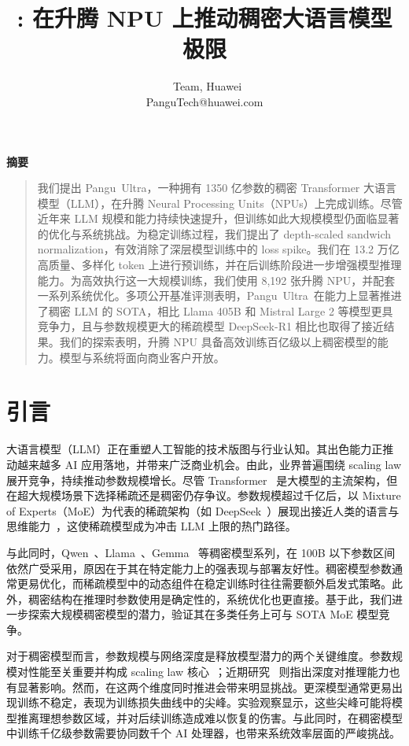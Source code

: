 \documentclass{article}
\title{\modelname: 在升腾 NPU 上推动稠密大语言模型极限}
\author{\pangu~Team, Huawei\\
PanguTech@huawei.com}
\newcommand{\pangu}{Pangu}
\newcommand{\modelname}{\pangu~Ultra}
\renewenvironment{abstract}
{
  \centerline{\large \bfseries 摘要}
  \vspace{0.5ex}
  \begin{quote}
}
{
  \end{quote}
}
\begin{document}
\maketitle

\thispagestyle{fancy}


\begin{abstract}

我们提出 \modelname，一种拥有 1350 亿参数的稠密 Transformer 大语言模型（LLM），在升腾 Neural Processing Units（NPUs）上完成训练。尽管近年来 LLM 规模和能力持续快速提升，但训练如此大规模模型仍面临显著的优化与系统挑战。为稳定训练过程，我们提出了 depth-scaled sandwich normalization，有效消除了深层模型训练中的 loss spike。我们在 13.2 万亿高质量、多样化 token 上进行预训练，并在后训练阶段进一步增强模型推理能力。为高效执行这一大规模训练，我们使用 8,192 张升腾 NPU，并配套一系列系统优化。多项公开基准评测表明，\modelname~在能力上显著推进了稠密 LLM 的 SOTA，相比 Llama 405B 和 Mistral Large 2 等模型更具竞争力，且与参数规模更大的稀疏模型 DeepSeek-R1 相比也取得了接近结果。我们的探索表明，升腾 NPU 具备高效训练百亿级以上稠密模型的能力。模型与系统将面向商业客户开放。
\end{abstract}



\section{引言}

大语言模型（LLM）正在重塑人工智能的技术版图与行业认知。其出色能力正推动越来越多 AI 应用落地，并带来广泛商业机会。由此，业界普遍围绕 scaling law 展开竞争，持续推动参数规模增长。尽管 Transformer~\cite{vaswani2017attention} 是大模型的主流架构，但在超大规模场景下选择稀疏还是稠密仍存争议。参数规模超过千亿后，以 Mixture of Experts（MoE）为代表的稀疏架构（如 DeepSeek~\cite{liu2024deepseek,deepseekv3}）展现出接近人类的语言与思维能力~\cite{jones2025large}，这使稀疏模型成为冲击 LLM 上限的热门路径。

与此同时，Qwen~\cite{bai2023qwen,yang2024qwen2}、Llama~\cite{grattafiori2024llama}、Gemma~\cite{team2024gemma} 等稠密模型系列，在 100B 以下参数区间依然广受采用，原因在于其在特定能力上的强表现与部署友好性。稠密模型参数通常更易优化，而稀疏模型中的动态组件在稳定训练时往往需要额外启发式策略。此外，稠密结构在推理时参数使用是确定性的，系统优化也更直接。基于此，我们进一步探索大规模稠密模型的潜力，验证其在多类任务上可与 SOTA MoE 模型竞争。

对于稠密模型而言，参数规模与网络深度是释放模型潜力的两个关键维度。参数规模对性能至关重要并构成 scaling law 核心~\cite{kaplan2020scaling}；近期研究~\cite{ye2024physics,merrill2025littledepth} 则指出深度对推理能力也有显著影响。然而，在这两个维度同时推进会带来明显挑战。更深模型通常更易出现训练不稳定，表现为训练损失曲线中的尖峰。实验观察显示，这些尖峰可能将模型推离理想参数区域，并对后续训练造成难以恢复的伤害。与此同时，在稠密模型中训练千亿级参数需要协同数千个 AI 处理器，也带来系统效率层面的严峻挑战。
\end{document}
